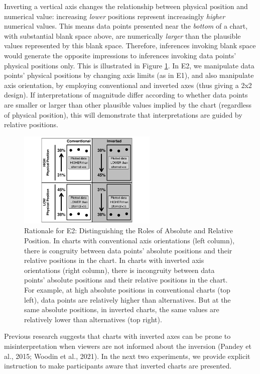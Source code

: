\documentclass[journal]{vgtc}                %
\begin{document}
Inverting a vertical axis changes the relationship between physical position and numerical value: increasing \emph{lower} positions represent increasingly \emph{higher} numerical values. This means data points presented near the \emph{bottom} of a chart, with substantial blank space above, are numerically \emph{larger} than the plausible values represented by this blank space. Therefore, inferences invoking blank space would generate the opposite impressions to inferences invoking data points' physical positions only. This is illustrated in Figure \ref{fig:r2-rationale-plot}. In E2, we manipulate data points' physical positions by changing axis limits (as in E1), and also manipulate axis orientation, by employing conventional and inverted axes (thus giving a 2x2 design). If interpretations of magnitude differ according to whether data points are smaller or larger than other plausible values implied by the chart (regardless of physical position), this will demonstrate that interpretations are guided by relative positions.

\begin{figure}
\includegraphics[width=250px]{position_magnitude_files/figure-latex/r2-rationale-plot-1} \caption{Rationale for E2: Distinguishing the Roles of Absolute and Relative Position. 
 In charts with conventional axis orientations (left column), there is congruity between data points’ absolute positions and their relative positions in the chart. 
 In charts with inverted axis orientations (right column), there is incongruity between data points’ absolute positions and their relative positions in the chart. 
 For example, at high absolute positions in conventional charts (top left), data points are relatively higher than alternatives. But at the same absolute positions, in inverted charts, the same values are relatively lower than alternatives (top right).}\label{fig:r2-rationale-plot}
\end{figure}

Previous research suggests that charts with inverted axes can be prone to misinterpretation when viewers are not informed about the inversion (Pandey et al., 2015; Woodin et al., 2021). In the next two experiments, we provide explicit instruction to make participants aware that inverted charts are presented.
\end{document}
